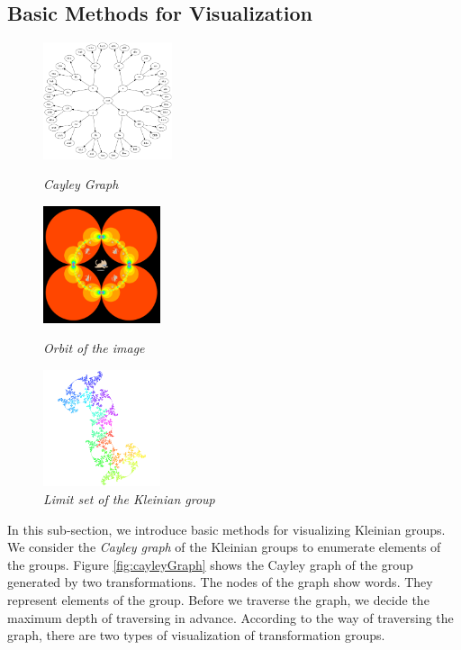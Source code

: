 \subsection{Basic Methods for Visualization}

\begin{figure}[htbp]
 \begin{minipage}[t]{0.333\hsize}
  \center
  \includegraphics[height=1.35in, keepaspectratio]{img/cayleyGraph.png}
  \caption{\textit{Cayley Graph}}
  \label{fig:cayleyGraph}
  \hspace*{\fill}
 \end{minipage}
 \begin{minipage}[t]{0.333\hsize}
  \center
  \includegraphics[height=1.35in, keepaspectratio]{img/preparation/basic/catOrbit.png}
  \caption{\textit{Orbit of the image}}
  \label{fig:orbitCat}
  \hspace*{\fill}
 \end{minipage}
 \begin{minipage}[t]{0.333\hsize}
  \center
  \includegraphics[height=1.35in, keepaspectratio]{img/preparation/limitSet/limit.png}
  \caption{\textit{Limit set of the Kleinian group}}
  \label{fig:limit}
  \hspace*{\fill}
 \end{minipage}
\end{figure}

\noindent In this sub-section, we introduce basic methods for visualizing Kleinian groups.
We consider the \textit{Cayley graph} of the Kleinian groups to enumerate elements
of the groups.
Figure \ref{fig:cayleyGraph} shows the Cayley graph of the group generated
by two transformations.
The nodes of the graph show words.
They represent elements of the group.
Before we traverse the graph, we decide the maximum depth of traversing in advance.
According to the way of traversing the graph, 
there are two types of visualization of transformation groups.

